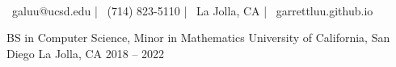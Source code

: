 \documentclass[]{awesome-cv}
\begin{document}
\begin{center}
	\vspace{-5mm}
	  \\
	\vspace{2mm}
	{\faEnvelope\ galuu@ucsd.edu} | {\faMobile\ (714) 823-5110} | {\faMapMarker\ La Jolla, CA} | {\faLink\ garrettluu.github.io}
\end{center}
\vspace{-3mm}
\begin{cventries}
	\cventry
	{BS in Computer Science, Minor in Mathematics}
	{University of California, San Diego}
	{La Jolla, CA}
	{2018 – 2022}
	{}
\end{cventries}
\end{document}

